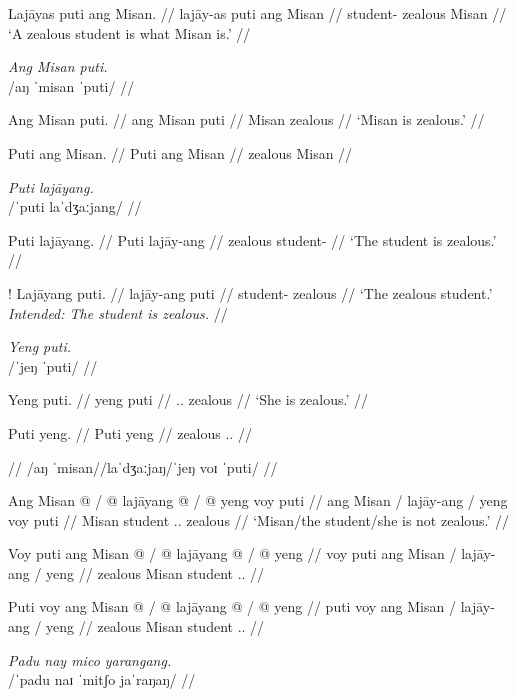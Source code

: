 \documentclass[12pt,a4paper]{scrartcl}
\newcommand{\TsgF}{{\Tsg}.{\F}}
\begin{document}
\a\begingl
\gla Lajāyas puti ang Misan. //
\glb lajāy-as puti ang Misan //
\glc student-\Parg{} zealous \Aarg{} Misan //
\glft `A zealous student is what Misan is.' //
\endgl
\xe

\pex
\a\begingl
\glpreamble \textit{Ang Misan puti.} \\
	/aŋ ˈmisan ˈputi/ //

\gla Ang Misan puti. //
\glb ang Misan puti //
\glc \Aarg{} Misan zealous //
\glft `Misan is zealous.' //
\endgl

\a\begingl
\gla Puti ang Misan. //
\glb Puti ang Misan //
\glc zealous \Aarg{} Misan //
\endgl
\xe

\pex
\a\begingl
\glpreamble \textit{Puti lajāyang.} \\
	/ˈputi laˈdʒaːjang/ //

\gla Puti lajāyang. //
\glb Puti lajāy-ang //
\glc zealous student-\Aarg{} //
\glft `The student is zealous.' //
\endgl

\a\ljudge!\begingl
\gla Lajāyang puti. //
\glb lajāy-ang puti //
\glc student-\Aarg{} zealous //
\glft `The zealous student.' \\
	\textit{Intended: The student is zealous.} //
\endgl
\xe

\pex
\a\begingl
\glpreamble \textit{Yeng puti.} \\
	/ˈjeŋ ˈputi/ //

\gla Yeng puti. //
\glb yeng puti //
\glc \TsgF{}.\Aarg{} zealous //
\glft `She is zealous.' //
\endgl

\a\begingl
\gla Puti yeng. //
\glb Puti yeng //
\glc zealous \TsgF{}.\Aarg{} //
\endgl
\xe

\pex
\a\begingl
\glpreamble {} //
	/aŋ ˈmisan//laˈdʒaːjaŋ/ˈjeŋ voɪ ˈputi/ //

\gla Ang Misan @ / @ lajāyang @ / @ yeng voy puti //
\glb ang Misan / lajāy-ang / yeng voy puti //
\glc \Aarg{} Misan {} student {} \TsgF{}.\Aarg{} \Neg{} zealous //
\glft `Misan/the student/she is not zealous.' //
\endgl

\a\begingl
\gla Voy puti ang Misan @ / @ lajāyang @ / @ yeng //
\glb voy puti ang Misan / lajāy-ang / yeng //
\glc \Neg{} zealous \Aarg{} Misan {} student {} \TsgF{}.\Aarg{} //
\endgl

\a\ljudge*\begingl
\gla Puti voy ang Misan @ / @ lajāyang @ / @ yeng //
\glb puti voy ang Misan / lajāy-ang / yeng //
\glc zealous \Neg{} \Aarg{} Misan {} student {} \TsgF{}.\Aarg{} //
\endgl
\xe

\ex\begingl
\glpreamble \textit{Padu nay mico yarangang.} \\
	/ˈpadu naɪ ˈmitʃo jaˈraŋaŋ/ //
\end{document}
